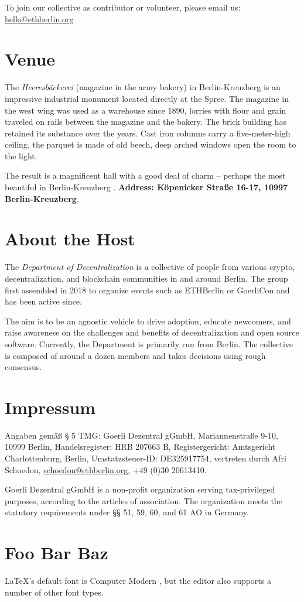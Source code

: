 \documentclass[a4paper,12pt]{article}
\begin{document}
  To join our collective as contributor or volunteer, please email us:\\
  \hspace*{3em}\url{hello@ethberlin.org}

  \section{Venue}
  The \textit{Heeresbäckerei} (magazine in the army bakery) \cite{backen} in Berlin-Kreuzberg is
  an impressive industrial monument located directly at the Spree. The magazine in the west wing
  was used as a warehouse since 1890, lorries with flour and grain traveled on rails between the
  magazine and the bakery. The brick building has retained its substance over the years. Cast iron
  columns carry a five-meter-high ceiling, the parquet is made of old beech, deep arched windows
  open the room to the light.

  The result is a magnificent hall with a good deal of charm – perhaps the most beautiful in Berlin-Kreuzberg \cite{xberg}. \textbf{Address: Köpenicker Straße 16-17, 10997 Berlin-Kreuzberg}.

  \section{About the Host}
  The \textit{Department of Decentralization} \cite{dod} is a collective of people from various
  crypto, decentralization, and blockchain communities in and around Berlin. The group first
  assembled in 2018 to organize events such as ETHBerlin \cite{ethberlin} or GoerliCon \cite{goerli} and has been active since.

  The aim is to be an agnostic vehicle to drive adoption, educate newcomers, and raise awareness
  on the challenges and benefits of decentralization and open source software. Currently, the
  Department is primarily run from Berlin. The collective is composed of around a dozen members
  and takes decisions using rough consensus.

  \section{Impressum}
  Angaben gemäß § 5 TMG: Goerli Dezentral gGmbH, Mariannenstraße 9-10, 10999 Berlin,
  Handelsregister: HRB 207663 B, Registergericht: Amtsgericht Charlottenburg, Berlin,
  Umstatzsteuer-ID: DE325917754, vertreten durch Afri Schoedon, \url{schoedon@ethberlin.org},
  +49 (0)30 20613410.

  Goerli Dezentral gGmbH is a non-profit organization serving tax-privileged
  purposes, according to the articles of association. The organization meets the statutory
  requirements under §§ 51, 59, 60, and 61 AO in Germany.

  \section{Foo Bar Baz}
  \LaTeX's default font is Computer Modern \cite{font}, but the editor also supports a number of other font types.

  \printbibliography
\end{document}
